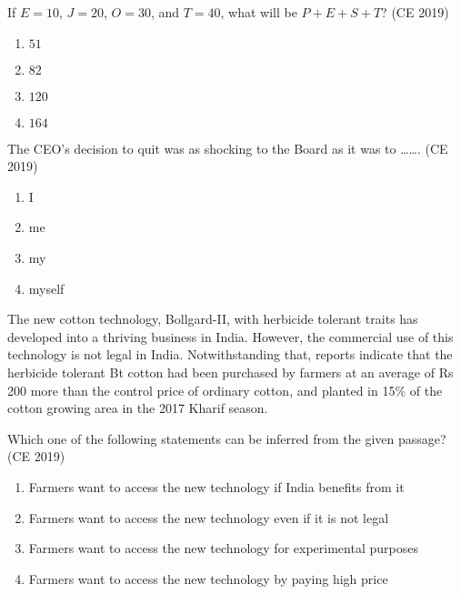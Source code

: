     \item If $E = 10$, $J = 20$, $O = 30$, and $T = 40$, what will be $P + E + S + T$?  \hfill (CE 2019)
    \begin{multicols}{4}
        \begin{enumerate}
            \item $51$
            \item $82$
            \item $120$
            \item $164$
        \end{enumerate}
    \end{multicols}

    \item The CEO's decision to quit was as shocking to the Board as it was to \ldots\ldots.  \hfill (CE 2019)
    \begin{multicols}{4}
        \begin{enumerate}
            \item I
            \item me
            \item my
            \item myself
        \end{enumerate}
    \end{multicols}


    \item The new cotton technology, Bollgard-II, with herbicide tolerant traits has developed into a thriving business in India. However, the commercial use of this technology is not legal in India. Notwithstanding that, reports indicate that the herbicide tolerant Bt cotton had been purchased by farmers at an average of Rs 200 more than the control price of ordinary cotton, and planted in 15\% of the cotton growing area in the 2017 Kharif season.

    Which one of the following statements can be inferred from the given passage?  \hfill (CE 2019)

    \begin{enumerate}
        \item Farmers want to access the new technology if India benefits from it
        \item Farmers want to access the new technology even if it is not legal
        \item Farmers want to access the new technology for experimental purposes
        \item Farmers want to access the new technology by paying high price
    \end{enumerate}

